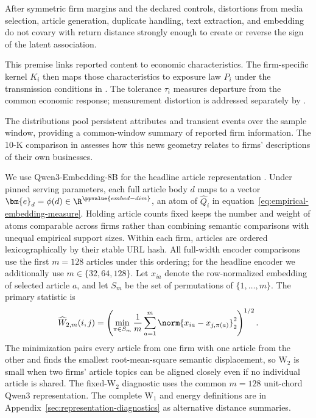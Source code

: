\begin{assumption}\label{ass:article-proxy}
  After symmetric firm margins and the declared controls, distortions from
  media selection, article generation, duplicate handling, text extraction,
  and embedding do not covary with return distance strongly enough to create
  or reverse the sign of the latent association.
\end{assumption}

This premise links reported content to economic characteristics.
The firm-specific kernel $K_i$ then maps those characteristics to exposure
law $P_i$ under the transmission conditions in .
The tolerance $\tau_i$ measures departure from the common economic response;
measurement distortion is addressed separately by .

The distributions pool persistent attributes and transient events over the
sample window, providing a common-window summary of reported firm information.
The 10-K comparison in  assesses how this
news geometry relates to firms' descriptions of their own businesses.

We use Qwen3-Embedding-8B for the headline article representation
\citep{qwen3_embedding_2025}.
Under pinned serving parameters, each full article body $d$ maps to a vector
$\bm{e}_d=\phi(d)\in\R^{\ppvalue{embed-dim}}$, an atom of
$\widehat Q_i$ in equation~\ref{eq:empirical-embedding-measure}.
Holding article counts fixed keeps the number and weight of atoms comparable
across firms rather than combining semantic comparisons with unequal
empirical support sizes.
Within each firm, articles are ordered lexicographically by their
stable URL hash.
All full-width encoder comparisons use the first $m=128$ articles under this
ordering; for the headline encoder we additionally use $m\in\{32,64,128\}$.
Let $x_{ia}$ denote the row-normalized embedding of selected article $a$, and
let $S_m$ be the set of permutations of $\{1,\ldots,m\}$.
The primary statistic is
\begin{equation}\label{eq:empirical-wasserstein-2}
  \widehat W_{2,m}(i,j)
  = \left(\min_{\pi\in S_m}\frac{1}{m}\sum_{a=1}^{m}
  \norm{x_{ia}-x_{j,\pi(a)}}_2^{2}\right)^{1/2}.
\end{equation}
The minimization pairs every article from one firm with one article from the
other and finds the smallest root-mean-square semantic displacement, so W$_2$
is small when two firms' article topics can be aligned closely even if no
individual article is shared.
The fixed-W$_2$ diagnostic uses the common $m=128$ unit-chord Qwen3
representation.
The complete W$_1$ and energy definitions are in
Appendix~\ref{sec:representation-diagnostics} as alternative distance summaries.

